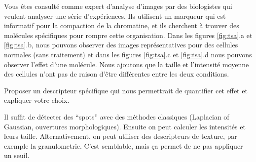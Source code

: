 \documentclass[11pt,addpoints]{exam}
\begin{document}
\begin{questions}

\question[3] Vous êtes consulté comme expert d'analyse d'images par
des biologistes qui veulent analyser une série d'expériences. Ils
utilisent un marqueur qui est informatif pour la compaction de la
chromatine, et ils cherchent à trouver des molécules spécifiques pour
rompre cette organisation. Dans les figures \ref{fig:tsa}.a et
\ref{fig:tsa}.b, nous pouvons observer des images représentatives pour
des cellules normales (sans traitement) et dans les figures
\ref{fig:tsa}.c et \ref{fig:tsa}.d nous pouvons observer l'effet d'une
molécule. Nous ajoutons que la taille et l'intensité moyenne des
cellules n'ont pas de raison d'être différentes entre les deux
conditions. 

Proposer un descripteur spécifique qui nous permettrait de quantifier
cet effet et expliquer votre choix. 
\begin{solution}
Il suffit de détecter des ``spots'' avec des méthodes classiques
(Laplacian of Gaussian, ouvertures morphologiques). Ensuite on peut
calculer les intensités et leurs taille. Alternativement, on peut
utiliser des descripteurs de texture, par exemple la
granulometrie. C'est semblable, mais ça permet de ne pas appliquer un
seuil. 
\end{solution}


\end{questions}
\end{document}
